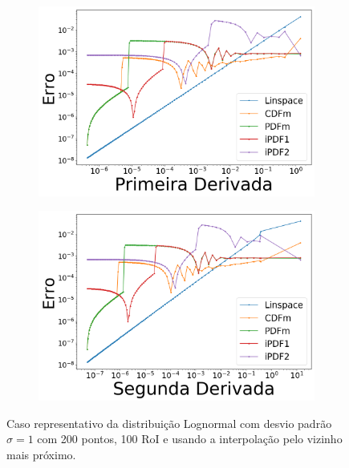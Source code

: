 \begin{figure}[H]
	\begin{subfigure}[b]{0.45\textwidth}
		\centering 
		\includegraphics[width=\textwidth]{./figuras/error_lognormal_nearest_Primeira_Derivada_1.png}
		\caption{}
		\label{fig:error_log_near_deriv}
	\end{subfigure}
	\hfill
	\begin{subfigure}[b]{0.45\textwidth}
		\centering 
		\includegraphics[width=\textwidth]{./figuras/error_lognormal_nearest_Segunda_Derivada_1.png}
		\caption{}
		\label{fig:error_log_near_deriv2}
	\end{subfigure}
	\caption{Caso representativo da distribuição Lognormal com desvio padrão $ \sigma = 1 $ com 200 pontos, 100 \ac{RoI} e usando a interpolação pelo vizinho mais próximo.}
	\label{fig:error_lognormal_nearest}
\end{figure}

